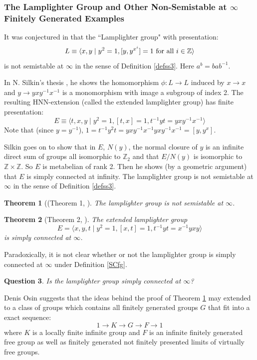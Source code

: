 \documentclass[12pt]{article}
\newtheorem{theorem}{Theorem}[subsection]
\newtheorem{question}[theorem]{Question}
\begin{document}
\subsubsection{The Lamplighter Group and Other Non-Semistable at $\infty$ Finitely Generated Examples }\label{NonSS}

It was conjectured in \cite{M4} that the ``Lamplighter group" with presentation: 
$$L\equiv \langle x,y\mid y^2=1, [y,y^{x^i}]=1 \hbox{ for all } i\in \mathbb Z\rangle$$
is  not semistable at $\infty$ in the sense of Definition \ref{defss3}. Here $a^b=bab^{-1}$. 

In N. Silkin's thesis \cite{Silk1}, he shows the homomorphism $\phi:L\to L$ induced by $x\to x$ and $y\to yxy^{-1}x^{-1}$ is a monomorphism with image a subgroup of index 2. The resulting HNN-extension (called the extended lamplighter group) has finite presentation:
$$E\equiv  \langle t,x,y\mid  y^2=1, [t,x]=1, t^{-1}yt=yxy^{-1}x^{-1}\rangle$$
Note that (since $y=y^{-1}$), $1=t^{-1}y^2t=yxy^{-1}x^{-1}yxy^{-1}x^{-1}=[y,y^x]$.

Silkin goes on to show that in $E$, $N(y)$, the normal closure of $y$ is an infinite direct sum of groups all isomorphic to $\mathbb Z_2$ and that $E/N(y)$ is isomorphic to $\mathbb Z\times\mathbb Z$. So $E$ is metabelian of rank 2. Then he shows (by a geometric argument) that  $E$ is simply connected at infinity. The lamplighter group is not semistable at $\infty$ in the sense of Definition \ref{defss3}.

\begin{theorem} [(Theorem 1, \cite{MML}] \label{LNss} 
The lamplighter group is not semistable at $\infty$.
\end{theorem}


\begin{theorem} [Theorem 2, \cite{Silk1}]\label{ExLsc} 
The extended lamplighter group 
$$E=\langle x,y,t\mid  y^2=1, [x,t]=1, t^{-1}yt=x^{-1}yxy\rangle$$
is simply connected at $\infty$. 
\end{theorem}
  
Paradoxically, it is not clear whether or not the lamplighter group is simply connected at $\infty$ under Definition \ref{SCfg}.

\begin{question}
Is the lamplighter group simply connected at $\infty$?
\end{question}
Denis Osin suggests that the ideas behind the proof of Theorem \ref{LNss} may extended to a class of groups which contains all finitely generated groups $G$ that fit into a exact sequence:
$$1\to K\to G\to F\to 1$$ 
where $K$ is a locally finite infinite group and $F$ is an infinite finitely generated free group as well as finitely generated not finitely presented limits of virtually free groups. 
\end{document}
